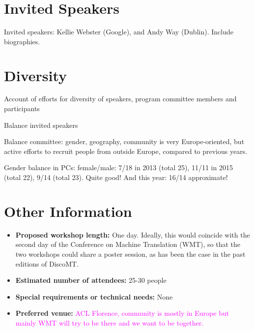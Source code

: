 \documentclass[11pt]{article}
\begin{document}

\section{Invited Speakers} %

Invited speakers: Kellie Webster (Google), and Andy Way (Dublin).  Include biographies.


\section{Diversity}

Account of efforts for diversity of speakers, program committee members and participants

Balance invited speakers

Balance committee: gender, geography, community is very Europe-oriented, but active efforts to recruit people from outside Europe, compared to previous years.

Gender balance in PCs: female/male: 7/18 in 2013 (total 25), 11/11 in 2015 (total 22), 9/14 (total 23).  Quite good!  And this year: 16/14 approximate!



\section{Other Information}

\begin{itemize}
\item \textbf{Proposed workshop length:} One day.  Ideally, this would coincide with
the second day of the Conference on Machine Translation (WMT), so that the two workshops could
share a poster session, as has been the case in the past editions of DiscoMT.

\item \textbf{Estimated number of attendees:} 25-30 people

\item \textbf{Special requirements or technical needs:} None

\item \textbf{Preferred venue:} \textcolor{magenta}{ACL Florence, community is mostly in Europe but mainly WMT will try to be there and we want to be together.} 
\end{itemize}
\end{document}
